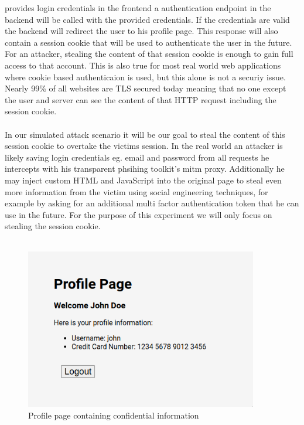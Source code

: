 \documentclass[12pt]{scrbook}
\begin{document}
provides login credentials in the frontend a authentication endpoint in the
backend will be called with the provided credentials. If the credentials are
valid the backend will redirect the user to his profile page. This response will
also contain a session cookie that will be used to authenticate the user in the
future.\\For an attacker, stealing the content of that session cookie is enough
to gain full access to that account. This is also true for most real world web
applications where cookie based authenticaion is used, but this alone is not a
securiy issue. Nearly 99\% of all websites are TLS secured today
\cite{tlsPercentage} meaning that no one except the user and server can see the
content of that HTTP request including the session cookie.\\ \\

In our simulated attack scenario it will be our goal to steal the content of
this session cookie to overtake the victims session. In the real world an
attacker is likely saving login credentials eg. email and password from all
requests he intercepts with his transparent phsihing toolkit's mitm proxy.
Additionally he may inject custom HTML and JavaScript into the original page to
steal even more information from the victim using social engineering techniques,
for example by asking for an additional multi factor authentication token that
he can use in the future. For the purpose of this experiment we will only focus
on stealing the session cookie.\\ \\

\begin{figure}[!htb] \centering
	\includegraphics[height=7cm]{./images/profile_page.png} \caption{Profile page
		containing confidential information} \end{figure}
\end{document}
